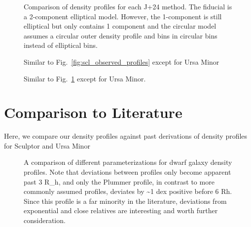 \begin{figure}
\centering
{}
\caption[Scl density methods]{Comparison of density profiles for each
J+24 method. The fiducial is a 2-component elliptical model. However,
the 1-component is still elliptical but only contains 1 component and
the circular model assumes a circular outer density profile and bins in
circular bins instead of elliptical
bins.}\label{fig:scl_density_j24_methods}
\end{figure}

\begin{figure}
\centering
{}
\caption[UMi density comparison]{Similar to
Fig.~\ref{fig:scl_observed_profiles} except for Ursa
Minor}\label{fig:umi_density_extras}
\end{figure}

\begin{figure}
\centering
{}
\caption[UMi density methods]{Similar to
Fig.~\ref{fig:scl_density_j24_methods} except for Ursa
Minor.}\label{fig:umi_density_j24_methods}
\end{figure}

\section{Comparison to Literature}\label{comparison-to-literature}

Here, we compare our density profiles against past derivations of
density profiles for Sculptor and Ursa Minor

\begin{figure}
\centering
{}
\caption[Comparison of analytic density profiles]{A comparison of
different parameterizations for dwarf galaxy density profiles. Note that
deviations between profiles only become apparent past 3 R\_h, and only
the Plummer profile, in contrast to more commonly assumed profiles,
deviates by \textasciitilde1 dex positive before 6 Rh. Since this
profile is a far minority in the literature, deviations from exponential
and close relatives are interesting and worth further consideration.}
\end{figure}
